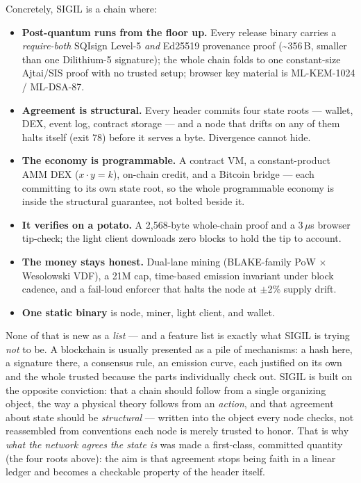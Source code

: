 \documentclass[10pt,a4paper]{article}
\begin{document}
Concretely, SIGIL is a chain where:

\begin{itemize}[leftmargin=1.5em,itemsep=2.5pt,label=\textcolor{sigilcyan}{$\diamond$}]
\item \textbf{Post-quantum runs from the floor up.} Every release binary carries a
\emph{require-both} SQIsign Level-5 \emph{and} Ed25519 provenance proof (\textasciitilde356\,B,
smaller than one Dilithium-5 signature); the whole chain folds to one constant-size
Ajtai/SIS proof with no trusted setup; browser key material is ML-KEM-1024 / ML-DSA-87.
\item \textbf{Agreement is structural.} Every header commits four state roots — wallet,
DEX, event log, contract storage — and a node that drifts on any of them halts itself
(exit 78) before it serves a byte. Divergence cannot hide.
\item \textbf{The economy is programmable.} A contract VM, a constant-product AMM DEX
($x\cdot y = k$), on-chain credit, and a Bitcoin bridge — each committing to its own state
root, so the whole programmable economy is inside the structural guarantee, not bolted
beside it.
\item \textbf{It verifies on a potato.} A 2{,}568-byte whole-chain proof and a
3\,$\mu$s browser tip-check; the light client downloads zero blocks to hold the tip to
account.
\item \textbf{The money stays honest.} Dual-lane mining (BLAKE-family PoW $\times$
Wesolowski VDF), a 21M cap, time-based emission invariant under block cadence, and a
fail-loud enforcer that halts the node at $\pm$2\% supply drift.
\item \textbf{One static binary} is node, miner, light client, and wallet.
\end{itemize}

None of that is new as a \emph{list} — and a feature list is exactly what SIGIL is trying
\emph{not} to be. A blockchain is usually presented as a pile of mechanisms: a hash here,
a signature there, a consensus rule, an emission curve, each justified on its own and the
whole trusted because the parts individually check out. SIGIL is built on the opposite
conviction: that a chain should follow from a single organizing object, the way a physical
theory follows from an \emph{action}, and that agreement about state should be
\emph{structural} — written into the object every node checks, not reassembled from
conventions each node is merely trusted to honor. That is why \emph{what the network agrees
the state is} was made a first-class, committed quantity (the four roots above): the aim is
that agreement stops being faith in a linear ledger and becomes a checkable property of the
header itself.
\end{document}
